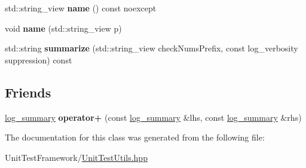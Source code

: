 \begin{DoxyCompactItemize}
\item 
\mbox{\label{classsequoia_1_1unit__testing_1_1log__summary_ae31ff93162182ee5fed0a43c33417b16}} 
std\+::string\+\_\+view {\bfseries name} () const noexcept
\item 
\mbox{\label{classsequoia_1_1unit__testing_1_1log__summary_a15209a4d31376677b94a157363c5dfde}} 
void {\bfseries name} (std\+::string\+\_\+view p)
\item 
\mbox{\label{classsequoia_1_1unit__testing_1_1log__summary_aad63bc2498a781b344fecb20a6f60d84}} 
std\+::string {\bfseries summarize} (std\+::string\+\_\+view check\+Nums\+Prefix, const log\+\_\+verbosity suppression) const
\end{DoxyCompactItemize}
\subsection*{Friends}
\begin{DoxyCompactItemize}
\item 
\mbox{\label{classsequoia_1_1unit__testing_1_1log__summary_a1e7196b0be0a7b0a12241b7dd09daeb5}} 
\mbox{\hyperlink{classsequoia_1_1unit__testing_1_1log__summary}{log\+\_\+summary}} {\bfseries operator+} (const \mbox{\hyperlink{classsequoia_1_1unit__testing_1_1log__summary}{log\+\_\+summary}} \&lhs, const \mbox{\hyperlink{classsequoia_1_1unit__testing_1_1log__summary}{log\+\_\+summary}} \&rhs)
\end{DoxyCompactItemize}


The documentation for this class was generated from the following file\+:\begin{DoxyCompactItemize}
\item 
Unit\+Test\+Framework/\mbox{\hyperlink{_unit_test_utils_8hpp}{Unit\+Test\+Utils.\+hpp}}\end{DoxyCompactItemize}
